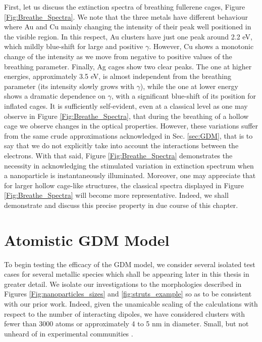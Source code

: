 First, let us discuss the extinction spectra of breathing fullerene cages, Figure \ref{Fig:Breathe_Spectra}. We note that the three metals have different behaviour where Au and Cu mainly changing the intensity of their peak well positioned in the visible region. In this respect, Au clusters have just one peak around 2.2 eV, which mildly blue-shift for large and positive $\gamma$. However, Cu shows a monotonic change of the intensity as we move from negative to positive values of the breathing parameter. Finally, Ag cages show two clear peaks. The one at higher energies, approximately 3.5 eV, is almost independent from the breathing parameter (its intensity slowly grows with $\gamma$), while the one at lower energy shows a dramatic dependence on $\gamma$, with a significant blue-shift of its position for inflated cages. It is sufficiently self-evident, even at a classical level as one may observe in Figure \ref{Fig:Breathe_Spectra}, that during the breathing of a hollow cage we observe changes in the optical properties. However, these variations suffer from the same crude approximations acknowledged in Sec. \ref{sec:GDM}, that is to say that we do not explicitly take into account the interactions between the electrons. With that said, Figure \ref{Fig:Breathe_Spectra} demonstrates the necessity in acknowledging the stimulated variation in extinction spectrum when a nanoparticle is instantaneously illuminated. Moreover, one may appreciate that for larger hollow cage-like structures, the classical spectra displayed in Figure \ref{Fig:Breathe_Spectra} will become more representative. Indeed, we shall demonstrate and discuss this precise property in due course of this chapter.

\section{Atomistic GDM Model}

To begin testing the efficacy of the GDM model, we consider several isolated test cases for several metallic species which shall be appearing later in this thesis in greater detail. We isolate our investigations to the morphologies described in Figures \ref{Fig:nanoparticles_sizes} and \ref{fig:struts_example} so as to be consistent with our prior work. Indeed, given the unamicable scaling of the calculations with respect to the number of interacting dipoles, we have considered clusters with fewer than 3000 atoms or approximately 4 to 5 nm in diameter. Small, but not unheard of in experimental communities \cite{JorgeStructure}.  

